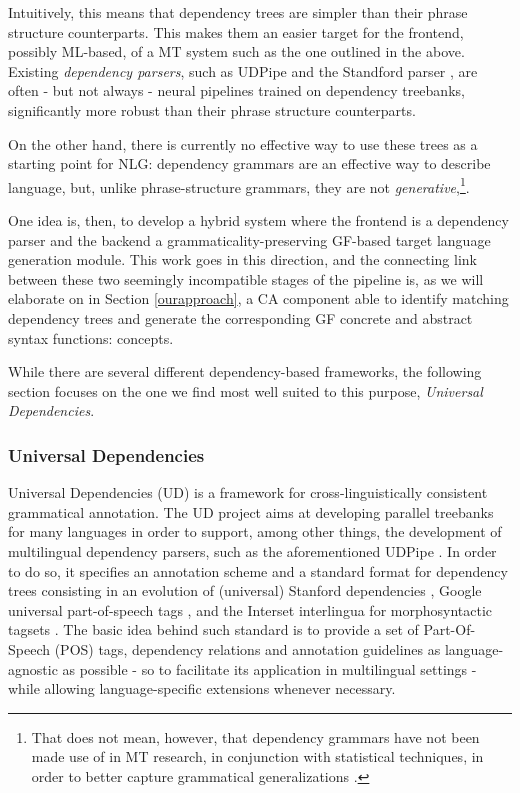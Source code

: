 Intuitively, this means that dependency trees are simpler than their phrase structure counterparts. This makes them an easier target for the frontend, possibly ML-based, of a MT system such as the one outlined in the above. 
Existing \textit{dependency parsers}, such as UDPipe \cite{udpipe1} and the Standford parser \cite{standford}, are often - but not always \cite{rasp} - neural pipelines trained on dependency treebanks, significantly more robust than their phrase structure counterparts. 

On the other hand, there is currently no effective way to use these trees as a starting point for NLG: dependency grammars are an effective way to describe language, but, unlike phrase-structure grammars, they are not \textit{generative},\footnote{That does not mean, however, that dependency grammars have not been made use of in MT research, in conjunction with statistical techniques, in order to better capture grammatical generalizations \cite{treelet}.}. \smallskip

One idea is, then, to develop a hybrid system where the frontend is a dependency parser and the backend a grammaticality-preserving GF-based target language generation module. 
This work goes in this direction, and the connecting link between these two seemingly incompatible stages of the pipeline is, as we will elaborate on in Section \ref{ourapproach}, a CA component able to identify matching dependency trees and generate the corresponding GF concrete and abstract syntax functions: concepts.

While there are several different dependency-based frameworks, the following section focuses on the one we find most well suited to this purpose, \textit{Universal Dependencies}. 

\subsubsection{Universal Dependencies} \label{ud} 
Universal Dependencies (UD) is a framework for cross-linguistically consistent grammatical annotation. 
The UD project aims at developing parallel treebanks for many languages in order to support, among other things, the development of multilingual dependency parsers, such as the aforementioned UDPipe \cite{udpipe1}. 
In order to do so, it specifies an annotation scheme and a standard format for dependency trees consisting in an evolution of (universal) Stanford dependencies \cite{st1, st2}, Google universal part-of-speech tags \cite{upos}, and the Interset interlingua for morphosyntactic tagsets \cite{tagconv}. 
The basic idea behind such standard is to provide a set of Part-Of-Speech (POS) tags, dependency relations and annotation guidelines as language-agnostic as possible - so to facilitate its application in multilingual settings - while allowing language-specific extensions whenever necessary. \smallskip

